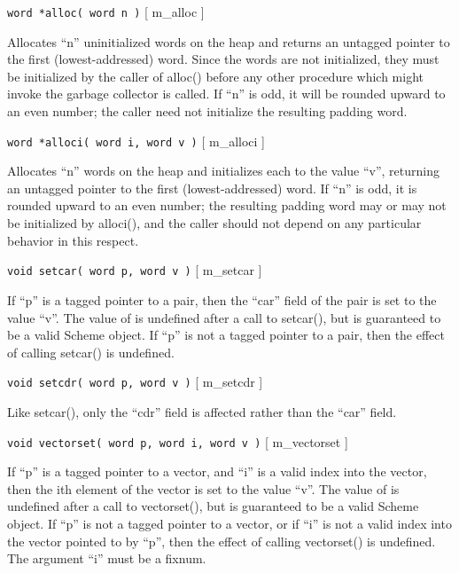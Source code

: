 \begin{description}

\item {{\tt word *alloc( word n )} \hfill [ {\sc m\_alloc} ]}

Allocates ``n'' uninitialized words on the heap and returns an untagged
pointer to the first (lowest-addressed) word. Since the words are not
initialized, they must be initialized by the caller of alloc() before
any other procedure which might invoke the garbage collector is
called. If ``n'' is odd, it will be rounded upward to an even number; the 
caller need not initialize the resulting padding word.

\item {{\tt word *alloci( word i, word v )} \hfill [ {\sc m\_alloci} ] }

Allocates ``n'' words on the heap and initializes each to the value ``v'',
returning an untagged pointer to the first (lowest-addressed) word.
If ``n'' is odd, it is rounded upward to an even number; the resulting
padding word may or may not be initialized by alloci(), and the caller
should not depend on any particular behavior in this respect.

\item {{\tt void setcar( word p, word v )} \hfill [ {\sc m\_setcar} ] }

If ``p'' is a tagged pointer to a pair, then the ``car'' field of the pair is
set to the value ``v''. The value of  is undefined after a call to 
setcar(), but is guaranteed to be a valid Scheme object. If ``p'' is not
a tagged pointer to a pair, then the effect of calling setcar() is 
undefined.

\item {{\tt void setcdr( word p, word v )} \hfill [ {\sc m\_setcdr} ] }

Like setcar(), only the ``cdr'' field is affected rather than the
``car'' field.

\item {{\tt void vectorset( word p, word i, word v )} \hfill [ {\sc m\_vectorset} ]}

If ``p'' is a tagged pointer to a vector, and ``i'' is a valid index
into the vector, then the ith element of the vector is set to the
value ``v''. The value of  is undefined after a call to
vectorset(), but is guaranteed to be a valid Scheme object. If ``p''
is not a tagged pointer to a vector, or if ``i'' is not a valid index
into the vector pointed to by ``p'', then the effect of calling
vectorset() is undefined. The argument ``i'' must be a fixnum.


\end{description}

